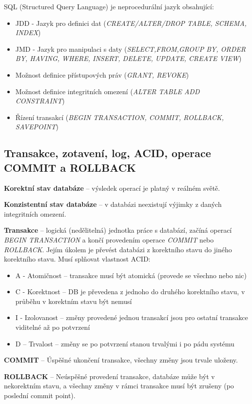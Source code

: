 SQL (Structured Query Language) je neprocedurální jazyk obsahující:
\begin{itemize}
\item JDD - Jazyk pro definici dat (\textit{CREATE/ALTER/DROP TABLE, SCHEMA, INDEX})
\item JMD - Jazyk pro manipulaci s daty (\textit{SELECT,FROM,GROUP BY, ORDER BY, HAVING, WHERE, INSERT, DELETE, UPDATE, CREATE VIEW})
\item Možnost definice přístupových práv (\textit{GRANT, REVOKE})
\item Možnost definice integritních omezení (\textit{ALTER TABLE ADD CONSTRAINT})
\item Řízení transakcí (\textit{BEGIN TRANSACTION, COMMIT, ROLLBACK, SAVEPOINT})
\end{itemize}

\subsection{Transakce, zotavení, log, ACID, operace COMMIT a ROLLBACK}
\textbf{Korektní stav databáze} -- výsledek operací je platný v reálném světě.

\textbf{Konzistentní stav databáze} -- v databázi neexistují výjimky z daných integritních omezení.

\textbf{Transakce} -- logická (nedělitelná) jednotka práce s databází, začíná operací \textit{BEGIN TRANSACTION} a končí provedením operace \textit{COMMIT} nebo \textit{ROLLBACK}. Jejím úkolem je převést databázi z korektního stavu do jiného korektního stavu. Musí splňovat vlastnost ACID:
\begin{itemize}
\item A - Atomičnost – transakce musí být atomická (provede se všechno nebo nic)
\item C - Korektnost – DB je převedena z jednoho do druhého korektního stavu, v průběhu v korektním stavu být nemusí
\item I - Izolovanost – změny provedené jednou transakcí jsou pro ostatní transakce viditelné až po potvrzení
\item D – Trvalost – změny se po potvrzení stanou trvalými i po pádu systému
\end{itemize}

\textbf{COMMIT} -- Úspěšné ukončení transakce, všechny změny jsou trvale uloženy.

\textbf{ROLLBACK} -- Neúspěšné provedení transakce, databáze může být v nekorektním stavu, a všechny změny v rámci transakce musí být zrušeny (po poslední commit point).

